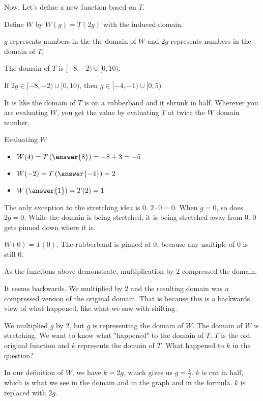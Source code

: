 \documentclass{ximera}
\begin{document}
Now, Let's define a new function based on $T$.



Define $W$ by $W(g) = T(2g)$ with the induced domain.



$g$ represents numbers in the the domain of $W$ and $2g$ represents numbers in the domain of $T$.  

The domain of $T$ is $[-8,-2) \cup [0,10)$.


If $2g \in [-8,-2) \cup [0,10)$, then $g \in [-4,-1) \cup [0,5)$

It is like the domain of $T$ is on a rubberband and it shrunk in half. Wherever you are evaluating $W$, you get the value by evaluating $T$ at twice the $W$ domain number.



\begin{example}  Evaluating $W$

\begin{itemize}
\item $W(4) = T\left(\answer{8}\right) = -8+3=-5$
\item $W(-2) = T\left(\answer{-4}\right) = 2$
\item $W\left(\answer{1}\right) = T(2) = 1$
\end{itemize}


\end{example}


The only exception to the stretching idea is $0$.  $2 \cdot 0 = 0$.  When $g = 0$, so does $2g = 0$.  While the domain is being stretched, it is being stretched away from $0$. $0$ gets pinned down where it is.


$W(0) = T(0)$.  The rubberband is pinned at $0$, because any multiple of $0$ is still $0$.  

As the funcitons above demonstrate, multiplication by $2$ compressed the domain.

It seems backwards.  We multiplied by $2$ and the resulting domain was a compressed version of the original domain.  That is because this is a backwards view of what happened, like what we saw with shifting.



We multiplied $g$ by $2$, but $g$ is representing the domain of $W$.  The domain of $W$ is stretching.  We want to know what "happened" to the domain of $T$.  $T$ is the old, original function and $k$ represents the domain of $T$.  What happened to $k$ in the question?

In our definition of $W$, we have $k=2g$, which gives us $g=\frac{k}{2}$.  $k$ is cut in half, which is what we see in the domain and in the graph and in the formula.  $k$ is replaced with $2g$.
\end{document}
